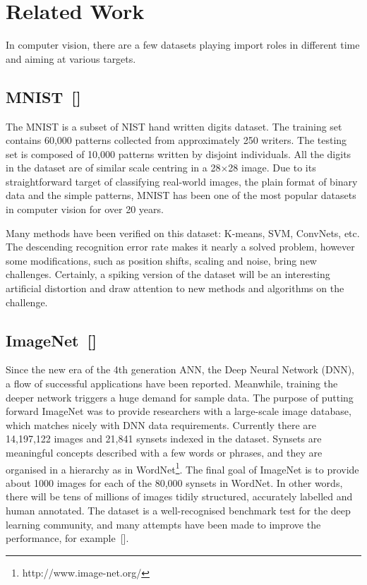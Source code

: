 \section{Related Work}
\label{sec:Related}
In computer vision, there are a few datasets playing import roles in different time and aiming at various targets.
\subsection{MNIST~[\cite{lecun_gradient-based_1998}]}
The MNIST is a subset of NIST hand written digits dataset. 
The training set contains 60,000 patterns collected from approximately 250 writers.
The testing set is composed of 10,000 patterns written by disjoint individuals.
All the digits in the dataset are of similar scale centring in a 28$ \times $28 image.
Due to its straightforward target of classifying real-world images, the plain format of binary data and the simple patterns, MNIST has been one of the most popular datasets in computer vision for over 20 years.

Many methods have been verified on this dataset: K-means, SVM, ConvNets, etc.
The descending recognition error rate makes it nearly a solved problem, however some modifications, such as position shifts, scaling and noise, bring new challenges.
Certainly, a spiking version of the dataset will be an interesting artificial distortion and draw attention to new methods and algorithms on the challenge. 

\subsection{ImageNet~[\cite{deng_imagenet:_2009}]}
Since the new era of the 4th generation ANN, the Deep Neural Network (DNN), a flow of successful applications have been reported.
Meanwhile, training the deeper network triggers a huge demand for sample data.
The purpose of putting forward ImageNet was to provide researchers with a large-scale image database, which matches nicely with DNN data requirements.
Currently there are 14,197,122 images and 21,841 synsets indexed in the dataset.
Synsets are meaningful concepts described with a few words or phrases, and they are organised in a hierarchy as in WordNet\footnote{http://www.image-net.org/}.
The final goal of ImageNet is to provide about 1000 images for each of the 80,000 synsets in WordNet.
In other words, there will be tens of millions of images tidily structured, accurately labelled and human annotated.
The dataset is a well-recognised benchmark test for the deep learning community, and many attempts have been made to improve the performance, for example~[\cite{krizhevsky2012imagenet}].

